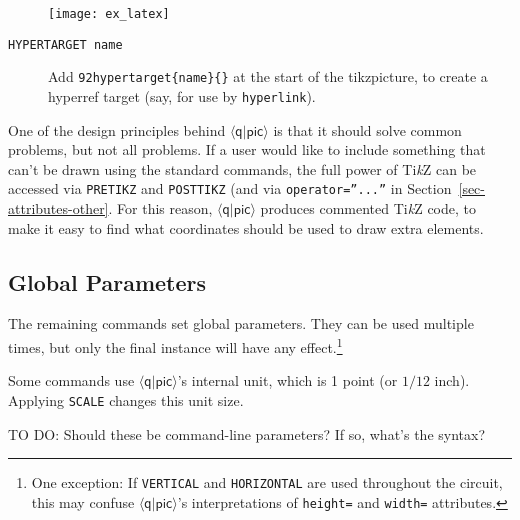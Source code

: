 \documentclass[twoside,12pt]{article}
\newcommand{\qpic}{$\langle\mathsf{q}|\mathsf{pic}\rangle$\xspace}
\newcommand{\TikZ}{Ti\emph{k}Z\xspace}
\begin{document}
\begin{description}
\begin{minipage}[b]{4in}

\end{minipage} \hfill \texttt{[image: ex\_latex]}

\item[{\tt HYPERTARGET name}] Add {\tt \char92hypertarget\{name\}\{\}} at the start of
  the tikzpicture, to create a hyperref target (say, for use by {\tt hyperlink}).

\begin{minipage}[b]{3.5in}

\end{minipage} \hfill 

\end{description}

One of the design principles behind \qpic is that it should solve common problems, but not all
problems.  If a user would like to include something that can't be drawn using the standard
commands, the full power of \TikZ can be accessed via {\tt PRETIKZ} and {\tt POSTTIKZ} (and via {\tt operator=''...''} in Section~\ref{sec-attributes-other}.
For this
reason, \qpic produces commented \TikZ code, to make it easy to find what coordinates should be
used to draw extra elements.


\subsection{Global Parameters}
\label{sec-parameters}

The remaining commands set global parameters.  They can be used multiple times, but only
the final instance will have any effect.\footnote{One exception:  If {\tt VERTICAL} and {\tt HORIZONTAL}
are used throughout the circuit, this may confuse \qpic's interpretations of {\tt height=}
and {\tt width=} attributes.}

Some commands use \qpic's internal unit, which is 1 point (or $1/12$ inch).  Applying
{\tt SCALE} changes this unit size.

TO DO: Should these be command-line parameters?  If so, what's the syntax?
\end{document}
